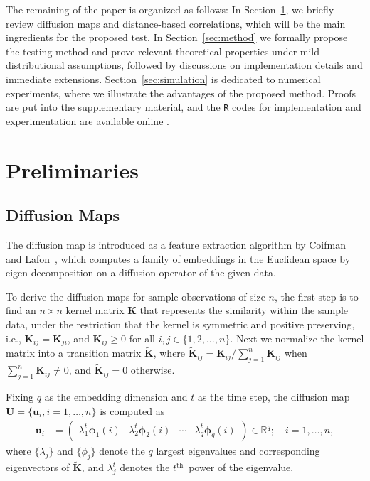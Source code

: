 \documentclass[11pt]{article}
\theoremstyle{definition}
\begin{document}
The remaining of the paper is organized as follows: In Section~\ref{sec:pre}, we briefly review diffusion maps and distance-based correlations, which will be the main ingredients for the proposed test. In Section~\ref{sec:method} we formally propose the testing method and prove relevant theoretical properties under mild distributional assumptions, followed by discussions on implementation details and immediate extensions. Section~\ref{sec:simulation} is dedicated to numerical experiments, where we illustrate the advantages of the proposed method. Proofs are put into the supplementary material, and the \texttt{R} codes for implementation and experimentation are available online \footnotemark{}.

\section{Preliminaries}
\label{sec:pre}
\subsection{Diffusion Maps}
\label{ssec:method2}

The diffusion map is introduced as a feature extraction algorithm by Coifman and Lafon~\cite{coifman2005geometric,coifman2006diffusion,lafon2006diffusion}, which computes a family of embeddings in the Euclidean space by eigen-decomposition on a diffusion operator of the given data. 

To derive the diffusion maps for sample observations of size $n$, the first step is to find an $n \times n$ kernel matrix $\mathbf{K}$ that represents the similarity within the sample data, under the restriction that the kernel is symmetric and positive preserving, i.e., $\mathbf{K}_{ij}=\mathbf{K}_{ji}$, and $\mathbf{K}_{ij} \geq 0$ for all $i,j \in \{1, 2, \ldots, n\}$. Next we normalize the kernel matrix into a transition matrix $\mathbf{\widetilde{K}}$, where $\mathbf{\widetilde{K}}_{ij} = \mathbf{K}_{ij} / \sum\limits_{j=1}^{n} \mathbf{K}_{ij}$ when $\sum\limits_{j=1}^{n} \mathbf{K}_{ij} \neq 0$, and $\mathbf{\widetilde{K}}_{ij}=0$ otherwise.

Fixing $q$ as the embedding dimension and $t$ as the time step, the diffusion map $\mathbf{U}=\{\mathbf{u}_i, i=1,\ldots,n\}$ is computed as 
\begin{align}
\label{eq:U}
\mathbf{u}_i  &= \begin{pmatrix} \lambda^{t}_{1} \mathbf{\phi}_{1}(i) & \lambda^{t}_{2} \mathbf{\phi}_{2} (i)  & \cdots & \lambda^{t}_{q} \mathbf{\phi}_{q}(i) \end{pmatrix} \in \mathbb{R}^{q}; \quad i = 1, \ldots, n,
\end{align}
where $\{ \lambda_{j} \}$ and $\{ \phi_{j}  \}$ denote the $q$ largest eigenvalues and corresponding eigenvectors of $\mathbf{\widetilde{K}}$, and $\lambda^{t}_{j}$ denotes the $t^{\mbox{th}}$~power of the eigenvalue.
\end{document}
